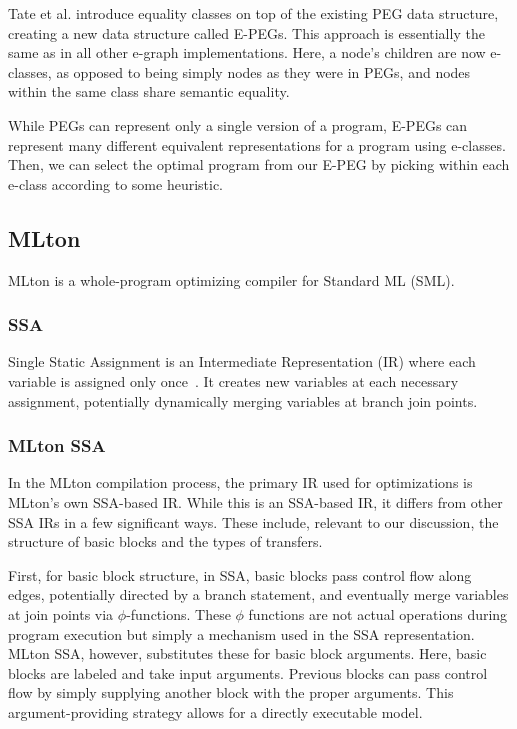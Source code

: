 \documentclass{article}
\begin{document}
Tate et al. introduce equality classes on top of the existing PEG data structure, creating a new data structure called E-PEGs. This approach is essentially the same as in all other e-graph implementations. Here, a node's children are now e-classes, as opposed to being simply nodes as they were in PEGs, and nodes within the same class share semantic equality.

While PEGs can represent only a single version of a program, E-PEGs can represent many different equivalent representations for a program using e-classes. Then, we can select the optimal program from our E-PEG by picking within each e-class according to some heuristic.



\subsection{MLton}

MLton is a whole-program optimizing compiler for Standard ML (SML).

\subsubsection{SSA}

Single Static Assignment is an Intermediate Representation (IR) where each variable is assigned only once~\cite{Brisk2022}. It creates new variables at each necessary assignment, potentially dynamically merging variables at branch join points.

\subsubsection{MLton SSA}

In the MLton compilation process, the primary IR used for optimizations is MLton's own SSA-based IR. While this is an SSA-based IR, it differs from other SSA IRs in a few significant ways. These include, relevant to our discussion, the structure of basic blocks and the types of transfers.

First, for basic block structure, in SSA, basic blocks pass control flow along edges, potentially directed by a branch statement, and eventually merge variables at join points via $\phi$-functions. These $\phi$ functions are not actual operations during program execution but simply a mechanism used in the SSA representation. MLton SSA, however, substitutes these for basic block arguments. Here, basic blocks are labeled and take input arguments. Previous blocks can pass control flow by simply supplying another block with the proper arguments. This argument-providing strategy allows for a directly executable model.
\end{document}

